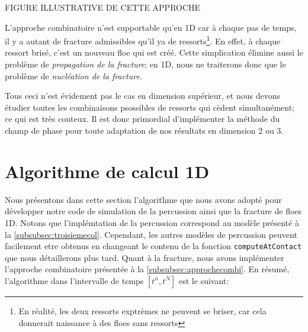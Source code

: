 FIGURE ILLUSTRATIVE DE CETTE APPROCHE


L'approche combinatoire n'est supportable qu'en 1D car à chaque pas de temps, il y a autant de fracture admissibles qu'il ya de ressorts\footnote{En réalité, les deux ressorts exptrèmes ne peuvent se briser, car cela donnerait naissance à des floes sans ressorts}. En effet, à chaque ressort brisé, c'est un nouveau floe qui est créé. Cette simplication élimine aussi le problème de \emph{propagation de la fracture}; en 1D, nous ne traiterons donc que le problème de \emph{nucléation de la fracture}. 

Tous ceci n'est évidement pas le cas en dimension supérieur, et nous devons étudier toutes les combinaisons psossibles de ressorts qui cèdent simultanément; ce qui est très couteux. Il est donc primordial d'implémenter la méthode du champ de phase pour toute adaptation de nos résultats en dimension 2 ou 3.







\section{Algorithme de calcul 1D}


Nous présentons dans cette section l'algorithme que nous avons adopté pour développer notre code de simulation de la percussion ainsi que la fracture de floes 1D. Notons que l'implémtation de la percussion correspond au modèle présenté à la \cref{subsubsec:troisiemecol}. Cependant, les autres modèles de percussion peuvent facilement etre obtenus en changeant le contenu de la fonction \texttt{computeAtContact} que nous détaillerons plus tard. Quant à la fracture, nous avons implémenter l'approche combinatoire présentée à la \cref{subsubsec:approchecombi}. En résumé, l'algorithme dans l'intervalle de temps $[t^n, t^{N}]$ est le suivant:

